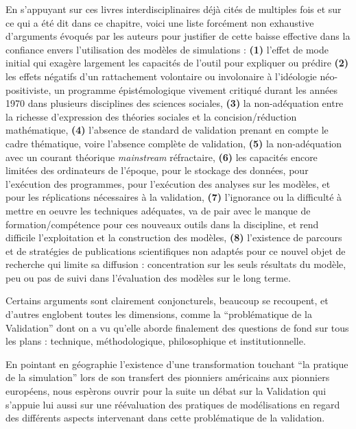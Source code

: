 En s'appuyant sur ces livres interdisciplinaires déjà cités de multiples fois \autocite{Dutton1971,Guetzkow1962, Guetzkow1972} et sur ce qui a été dit dans ce chapitre, voici une liste forcément non exhaustive d'arguments évoqués par les auteurs pour justifier de cette baisse effective dans la confiance envers l'utilisation des modèles de simulations : \textbf{(1)} l'effet de mode initial qui exagère largement les capacités de l'outil pour expliquer ou prédire \textbf{(2)} les effets négatifs d'un rattachement volontaire ou involonaire à l'idéologie néo-positiviste, un programme épistémologique vivement critiqué durant les années 1970 dans plusieurs disciplines des sciences sociales, \textbf{(3)} la non-adéquation entre la richesse d'expression des théories sociales et la concision/réduction mathématique, \textbf{(4)} l'absence de standard de validation prenant en compte le cadre thématique, voire l'absence complète de validation, \textbf{(5)} la non-adéquation avec un courant théorique \textit{mainstream} réfractaire, \textbf{(6)} les capacités encore limitées des ordinateurs de l'époque, pour le stockage des données, pour l'exécution des programmes, pour l'exécution des analyses sur les modèles, et pour les réplications nécessaires à la validation, \textbf{(7)} l'ignorance ou la difficulté à mettre en oeuvre les techniques adéquates, va de pair avec le manque de formation/compétence pour ces nouveaux outils dans la discipline, et rend difficile l'exploitation et la construction des modèles, \textbf{(8)} l'existence de parcours et de stratégies de publications scientifiques non adaptés pour ce nouvel objet de recherche qui limite sa diffusion : concentration sur les seuls résultats du modèle, peu ou pas de suivi dans l'évaluation des modèles sur le long terme.

Certains arguments sont clairement conjoncturels, beaucoup se recoupent, et d'autres englobent toutes les dimensions, comme la \enquote{problématique de la Validation} dont on a vu qu'elle aborde finalement des questions de fond sur tous les plans : technique, méthodologique, philosophique et institutionnelle. %

En pointant en géographie l'existence d'une transformation touchant \enquote{la pratique de la simulation} lors de son transfert des pionniers américains aux pionniers européens, nous espèrons ouvrir pour la suite un débat sur la Validation qui s'appuie lui aussi sur une réévaluation des pratiques de modélisations en regard des différents aspects intervenant dans cette problématique de la validation. %


